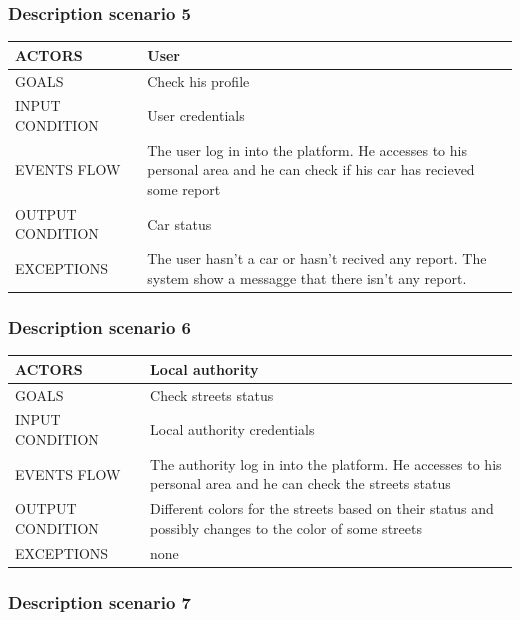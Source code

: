 \subsubsection{Description scenario 5}

\begin{center}
	\begin{tabular}{ | l | p{6cm} | } 
		\hline
		ACTORS & User  \\ 
		\hline
		GOALS & Check his profile  \\ 
		\hline
		INPUT CONDITION & User credentials  \\ 
		\hline
		EVENTS FLOW & The user log in into the platform. He accesses to his personal area and he can check if his car has recieved some report \\ 
		\hline
		OUTPUT CONDITION & Car status \\ 
		\hline
		EXCEPTIONS & The user hasn't a car or hasn't recived any report. The system show a messagge that there isn't any report.  \\ 
		\hline
	\end{tabular}
\end{center}

\subsubsection{Description scenario 6}

\begin{center}
	\begin{tabular}{ | l | p{6cm} | } 
		\hline
		ACTORS & Local authority  \\ 
		\hline
		GOALS & Check streets status  \\ 
		\hline
		INPUT CONDITION & Local authority credentials  \\ 
		\hline
		EVENTS FLOW & The authority log in into the platform. He accesses to his personal area and he can check the streets status \\ 
		\hline
		OUTPUT CONDITION & Different colors for the streets based on their status and possibly changes to the color of some streets \\ 
		\hline
		EXCEPTIONS & none \\ 
		\hline
	\end{tabular}
\end{center}

\subsubsection{Description scenario 7}

